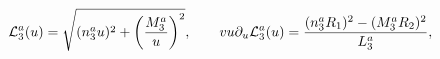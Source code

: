 \begin{equation}
{\cal L}^a_3(u) = \sqrt{(n^a_3u)^2+ \left(\frac{M^a_3}{u}\right)^2}, \qquad
vu\partial_u{\cal L}^a_3(u) = \frac{(n^a_3R_1)^2-(M^a_3R_2)^2}{L^a_3},
\nonumber%
\end{equation}

